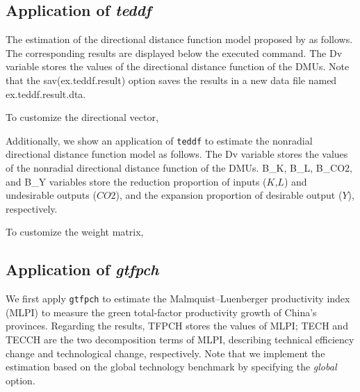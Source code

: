 \begin{stlog}
	
\end{stlog}


\subsection{Application of \textit{teddf}}
The estimation of the directional distance function model proposed by \cite{Chung1997} as follows. The corresponding results are displayed below the executed command. The Dv variable stores the values of the directional distance function of the DMUs. Note that the sav(ex.teddf.result) option saves the results in a new data file named ex.teddf.result.dta.

\begin{stlog}
	
\end{stlog}

To customize the directional vector, 
\begin{stlog}
	
\end{stlog}

Additionally, we show an application of {\tt teddf} to estimate the nonradial directional distance function model as follows. The Dv variable stores the values of the nonradial directional distance function of the DMUs. B\_K, B\_L, B\_CO2, and B\_Y variables store the reduction proportion of inputs ($K$,$L$) and undesirable outputs ($CO2$), and the expansion proportion of desirable output ($Y$), respectively.

\begin{stlog}
	
\end{stlog}

To customize the weight matrix, 
\begin{stlog}
	
\end{stlog}


\subsection{Application of \textit{gtfpch}}
We first apply {\tt gtfpch} to estimate the Malmquist–Luenberger productivity index (MLPI) to measure the green total-factor productivity growth of China's provinces. Regarding the results, TFPCH stores the values of MLPI; TECH and TECCH are the two decomposition terms of MLPI, describing technical efficiency change and technological change, respectively. Note that we implement the estimation based on the global technology benchmark by specifying the \textit{global} option.

